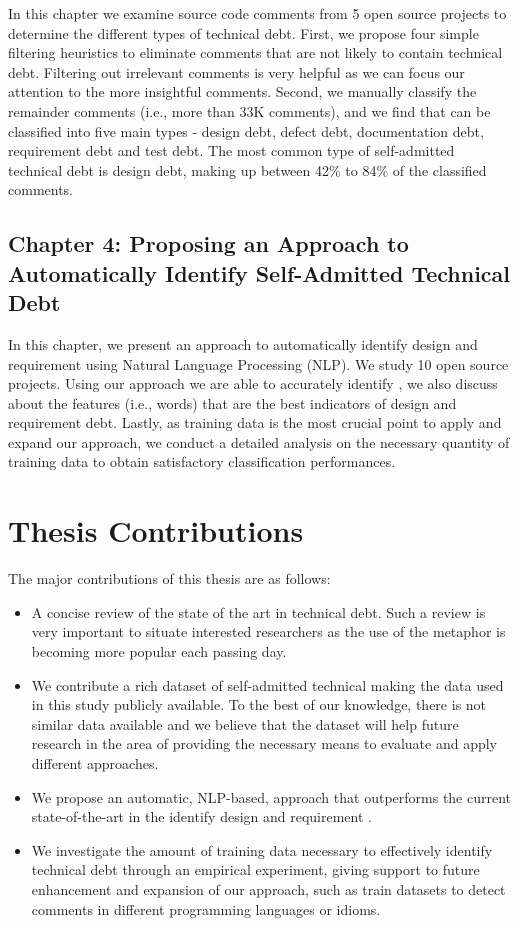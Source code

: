 In this chapter we examine source code comments from 5 open source projects to determine the different types of technical debt. First, we propose four simple filtering heuristics to eliminate comments that are not likely to contain technical debt. Filtering out irrelevant comments is very helpful as we can focus our attention to the more insightful comments. Second, we manually classify the remainder comments (i.e., more than 33K comments), and we find that \SATD can be classified into five main types - design debt, defect debt, documentation debt, requirement debt and test debt. The  most common type of self-admitted technical debt is design debt, making up between 42\% to 84\% of the classified comments.

\subsection{Chapter 4: Proposing an Approach to Automatically Identify Self-Admitted Technical Debt}

In this chapter, we present an approach to automatically identify design and requirement \SATD using Natural Language Processing (NLP). We study 10 open source projects. Using our approach we are able to accurately identify \SATD, we also discuss about the features (i.e., words) that are the best indicators of design and requirement debt. Lastly, as training data is the most crucial point to apply and expand our approach, we conduct a detailed analysis on the necessary quantity of training data to obtain satisfactory classification performances.

\section{Thesis Contributions}

The major contributions of this thesis are as follows:
\begin{itemize}

\item A concise review of the state of the art in technical debt. Such a review is very important to situate interested researchers as the use of the metaphor is becoming more popular each passing day.

\item We contribute a rich dataset of self-admitted technical making the data used in this study publicly available. To the best of our knowledge, there is not similar data available and we believe that the dataset will help future research in the area of \SATD providing the necessary means to evaluate and apply different approaches.

\item We propose an automatic, NLP-based, approach that outperforms the current state-of-the-art in the identify design and requirement \SATD. 

\item We investigate the amount of training data necessary to effectively identify technical debt through an empirical experiment, giving support to future enhancement and expansion of our approach, such as train datasets to detect \SATD comments in different programming languages or idioms.

\end{itemize}

